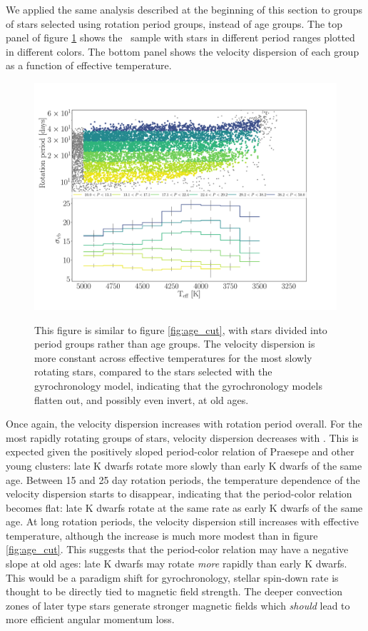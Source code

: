 We applied the same analysis described at the beginning of this section to
groups of stars selected using rotation period groups, instead of age groups.
The top panel of figure \ref{fig:period_cut} shows the \mct\ sample with
stars in different period ranges plotted in different colors.
The bottom panel shows the velocity dispersion of each group as a function of
effective temperature.
\begin{figure}
  \caption{
This figure is similar to figure \ref{fig:age_cut}, with stars divided into
    period groups rather than age groups.
The velocity dispersion is more constant across effective temperatures for the
    most slowly rotating stars, compared to the stars selected with the
    \citet{angus2019} gyrochronology model, indicating that the gyrochronology
    models flatten out, and possibly even invert, at old ages.
}
  \centering
    \includegraphics[width=1\textwidth]{period_cut}
\label{fig:period_cut}
\end{figure}
Once again, the velocity dispersion increases with rotation period overall.
For the most rapidly rotating groups of stars, velocity dispersion decreases
with \teff.
This is expected given the positively sloped period-color relation of Praesepe
and other young clusters: late K dwarfs rotate more slowly than early K dwarfs
of the same age.
Between 15 and 25 day rotation periods, the temperature dependence of the
velocity dispersion starts to disappear, indicating that the period-color
relation becomes flat: late K dwarfs rotate at the same rate as early K dwarfs
of the same age.
At long rotation periods, the velocity dispersion still increases with
effective temperature, although the increase is much more modest than in
figure \ref{fig:age_cut}.
This suggests that the period-color relation may have a negative slope at old
ages: late K dwarfs may rotate {\it more} rapidly than early K dwarfs.
This would be a paradigm shift for gyrochronology, stellar spin-down rate is
thought to be directly tied to magnetic field strength.
The deeper convection zones of later type stars generate stronger magnetic
fields which {\it should} lead to more efficient angular momentum loss.
